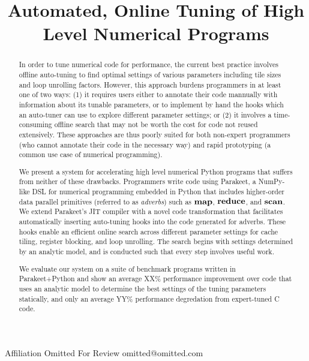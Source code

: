 \documentclass[preprint,9pt]{sigplanconf}
\begin{document}
\copyrightdata{[to be supplied]} 

\titlebanner{}        %

\title{Automated, Online Tuning of High Level Numerical Programs}

           {Affiliation Omitted For Review}
           {omitted@omitted.com}

\newcommand{\MAP}{\impfnt{map}}
\newcommand{\REDUCE}{\impfnt{reduce}}
\newcommand{\SCAN}{\impfnt{scan}}
\newcommand{\ALLPAIRS}{\impfnt{allpairs}}
\newcommand{\concat}{\ensuremath{+\!\!\!\!+\,}}

\maketitle

\begin{abstract}
In order to tune numerical code for performance, the current best practice involves offline auto-tuning to find optimal settings of various parameters including tile sizes and loop unrolling factors.  However, this approach burdens programmers in at least one of two ways: (1) it requires users either to annotate their code mannually with information about its tunable parameters, or to implement by hand the hooks which an auto-tuner can use to explore different parameter settings; or (2) it involves a time-consuming offline search that may not be worth the cost for code not reused extensively.  These approaches are thus poorly suited for both non-expert programmers (who cannot annotate their code in the necessary way) and rapid prototyping (a common use case of numerical programming).

We present a system for accelerating high level numerical Python programs that suffers from neither of these drawbacks. Programmers write code using Parakeet, a NumPy-like DSL for numerical programming embedded in Python that includes higher-order data parallel primitives (referred to as \emph{adverbs}) such as $\MAP$, $\REDUCE$, and $\SCAN$.  We extend Parakeet's JIT compiler with a novel code transformation that facilitates automatically inserting auto-tuning hooks into the code generated for adverbs.  These hooks enable an efficient online search across different parameter settings for cache tiling, register blocking, and loop unrolling.  The search begins with settings determined by an analytic model, and is conducted such that every step involves useful work.

We evaluate our system on a suite of benchmark programs written in Parakeet+Python and show an average XX\% performance improvement over code that uses an analytic model to determine the best settings of the tuning parameters statically, and only an average YY\% performance degredation from expert-tuned C code.
\end{abstract}
\end{document}
